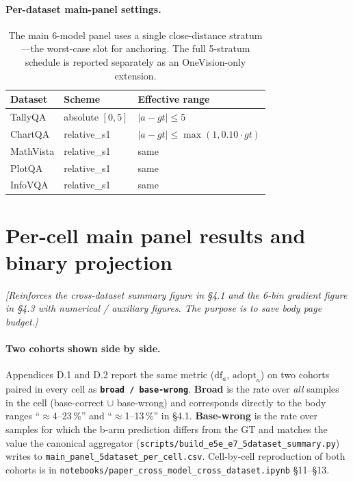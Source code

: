 \documentclass[11pt]{article}
\newcommand{\todoNote}[1]{\textit{\textcolor[rgb]{0.45,0.45,0.45}{[#1]}}}
\begin{document}
\paragraph{Per-dataset main-panel settings.}
\begin{table}[h]
  \centering
  \small
  \begin{tabular}{lll}
    \toprule
    \textbf{Dataset} & \textbf{Scheme} & \textbf{Effective range} \\
    \midrule
    TallyQA & absolute $[0, 5]$ & $|a - gt| \leq 5$ \\
    ChartQA & relative\_s1 & $|a - gt| \leq \max(1, 0.10 \cdot gt)$ \\
    MathVista & relative\_s1 & same \\
    PlotQA & relative\_s1 & same \\
    InfoVQA & relative\_s1 & same \\
    \bottomrule
  \end{tabular}
  \caption{The main 6-model panel uses a single close-distance stratum---the worst-case slot for anchoring. The full 5-stratum schedule is reported separately as an OneVision-only extension.}
  \label{tab:anchor-per-dataset}
\end{table}

\section{Per-cell main panel results and binary projection}
\label{app:per-cell}

\todoNote{Reinforces the cross-dataset summary figure in \S4.1 and the 6-bin gradient figure in \S4.3 with \textit{numerical / auxiliary} figures. The purpose is to save body page budget.}

\paragraph{Two cohorts shown side by side.} Appendices D.1 and D.2 report the same metric ($\mathrm{df}_a$, $\mathrm{adopt}_a$) on two cohorts paired in every cell as \textbf{\texttt{broad / base-wrong}}. \textbf{Broad} is the rate over \textit{all} samples in the cell (base-correct $\cup$ base-wrong) and corresponds directly to the body ranges \mbox{``$\approx$4--23\,\%''} and \mbox{``$\approx$1--13\,\%''} in \S4.1. \textbf{Base-wrong} is the rate over samples for which the b-arm prediction differs from the GT and matches the value the canonical aggregator (\texttt{scripts/build\_e5e\_e7\_5dataset\_summary.py}) writes to \texttt{main\_panel\_5dataset\_per\_cell.csv}. Cell-by-cell reproduction of both cohorts is in \texttt{notebooks/paper\_cross\_model\_cross\_dataset.ipynb} \S11--\S13.
\end{document}
